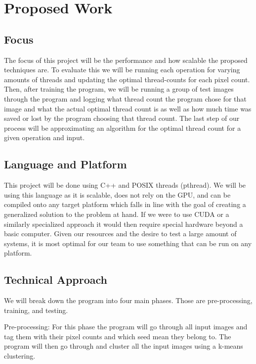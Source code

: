 \documentclass{article}
\begin{document}
    \section{Proposed Work}
        \begin{multicols}{2}
            \subsection{Focus}
                The focus of this project will be the performance and how scalable the proposed techniques are.  To evaluate this we will be running each operation for varying amounts of threads and updating the optimal thread-counts for each pixel count.  Then, after training the program, we will be running a group of test images through the program and logging what thread count the program chose for that image and what the actual optimal thread count is as well as how much time was saved or lost by the program choosing that thread count.  The last step of our process will be approximating an algorithm for the optimal thread count for a given operation and input.
            
            \subsection{Language and Platform}
                This project will be done using C++ and POSIX threads (pthread). We will be using this language as it is scalable, does not rely on the GPU, and can be compiled onto any target platform which falls in line with the goal of creating a generalized solution to the problem at hand.  If we were to use CUDA or a similarly specialized approach it would then require special hardware beyond a basic computer.  Given our resources and the desire to test a large amount of systems, it is most optimal for our team to use something that can be run on any platform.
        
            \subsection{Technical Approach}
                We will break down the program into four main phases.  Those are pre-processing, training, and testing.
                
                Pre-processing:  For this phase the program will go through all input images and tag them with their pixel counts and which seed mean they belong to.  The program will then go through and cluster all the input images using a k-means clustering.
                

\end{multicols}
\end{document}
